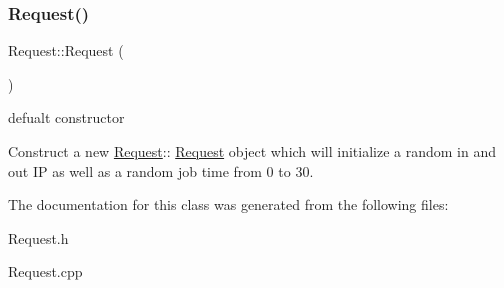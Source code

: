 \subsubsection{\texorpdfstring{Request()}{Request()}}
{\footnotesize\ttfamily Request\+::\+Request (\begin{DoxyParamCaption}{ }\end{DoxyParamCaption})}



defualt constructor 

Construct a new \hyperlink{classRequest}{Request}\+:\+: \hyperlink{classRequest}{Request} object which will initialize a random in and out IP as well as a random job time from 0 to 30. 

The documentation for this class was generated from the following files\+:\begin{DoxyCompactItemize}
\item 
Request.\+h\item 
Request.\+cpp\end{DoxyCompactItemize}
